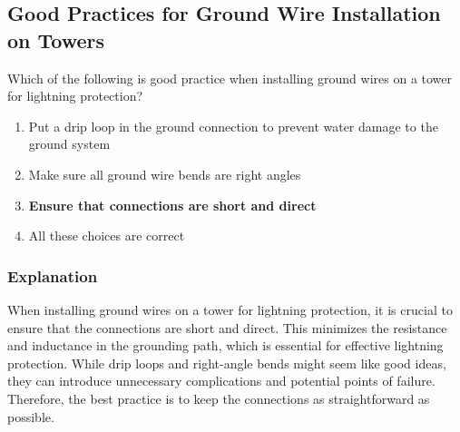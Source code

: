 \subsection{Good Practices for Ground Wire Installation on Towers}
\label{T0B01}

\begin{tcolorbox}[colback=gray!10!white,colframe=black!75!black,title=T0B01]
Which of the following is good practice when installing ground wires on a tower for lightning protection?
\begin{enumerate}[noitemsep]
    \item Put a drip loop in the ground connection to prevent water damage to the ground system
    \item Make sure all ground wire bends are right angles
    \item \textbf{Ensure that connections are short and direct}
    \item All these choices are correct
\end{enumerate}
\end{tcolorbox}

\subsubsection*{Explanation}
When installing ground wires on a tower for lightning protection, it is crucial to ensure that the connections are short and direct. This minimizes the resistance and inductance in the grounding path, which is essential for effective lightning protection. While drip loops and right-angle bends might seem like good ideas, they can introduce unnecessary complications and potential points of failure. Therefore, the best practice is to keep the connections as straightforward as possible.